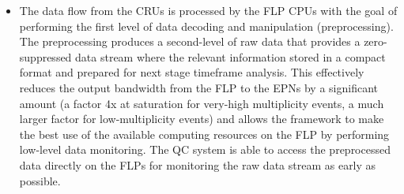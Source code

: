 \begin{itemize}
\item The data flow from the CRUs is processed by the FLP CPUs with the goal of performing the first level of data decoding and manipulation (preprocessing). The preprocessing produces a second-level of raw data that provides a zero-suppressed data stream where the relevant information stored in a compact format and prepared for next stage timeframe analysis. This effectively reduces the output bandwidth from the FLP to the EPNs by a significant amount (a factor 4x at saturation for very-high multiplicity events, a much larger factor for low-multiplicity events) and allows the framework to make the best use of the available computing resources on the FLP by performing low-level data monitoring. The QC system is able to access the preprocessed data directly on the FLPs for monitoring the raw data stream as early as possible.
\end{itemize}
